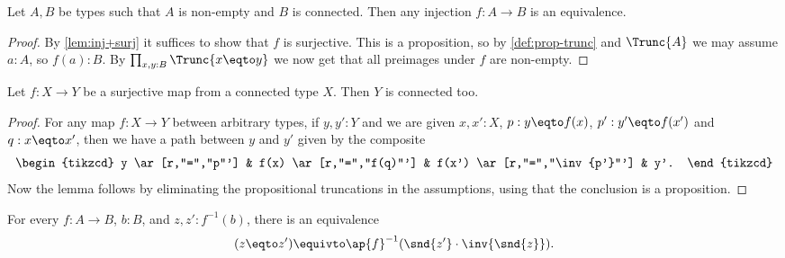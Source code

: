 \begin{corollary}\label{cor:inj+connected}
Let $A,B$ be types such that $A$ is non-empty and $B$ is connected.
Then any injection $f: A\to B$ is an equivalence.
\end{corollary}
\begin{proof}
By \cref{lem:inj+surj} it suffices to show that $f$ is surjective.
This is a proposition, so by \cref{def:prop-trunc} and $\Trunc{A}$
we may assume $a:A$, so $f(a):B$. By $\prod_{x,y:B} \Trunc{x \eqto y}$
we now get that all preimages under $f$ are non-empty.
\end{proof}

\begin{lemma}\label{lem:whenisbasespaceconnected}
Let $f:X\to Y$ be a surjective map from a connected type $X$. Then $Y$ is connected too.
\end{lemma}
\begin{proof}
For any map $f:X\to Y$ between arbitrary types, if $y,y':Y$ and we are given
$x,x':X$, $p:y \eqto f(x)$, $p':y' \eqto f(x')$ and $q:x \eqto x'$,
then we have a path between $y$ and $y'$ given by the composite
\[
  \begin{tikzcd}
    y \ar[r,"=","p"'] & f(x) \ar[r,"=","f(q)"'] & f(x') \ar[r,"=","\inv{p'}"'] & y'.
  \end{tikzcd}
\]
Now the lemma follows by eliminating the propositional truncations in the assumptions,
using that the conclusion is a proposition.
\end{proof}

\begin{construction}\label{con:fib-vs-path}
  For every $f:A\to B$, $b:B$, and $z,z' : f^{-1}(b)$,
  there is an equivalence
  \begin{equation}\label{eq:fib_vs-path}
    (z \eqto z') \equivto \ap{f}^{-1}(\snd{z'} \cdot \inv{\snd{z}}).
  \end{equation}
\end{construction}

